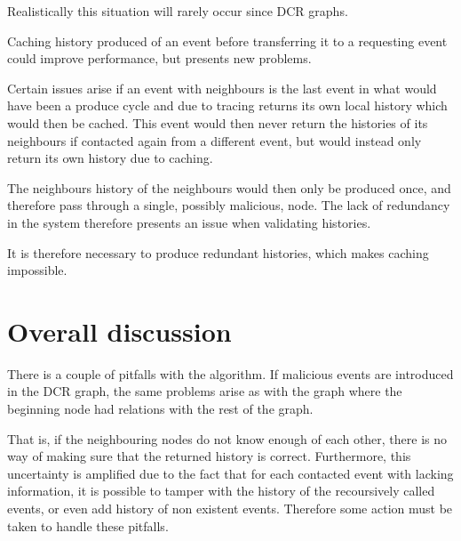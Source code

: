 	Realistically this situation will rarely occur since DCR graphs. 
	
	\newpar Caching history produced of an event before transferring it to a requesting event could improve performance, but presents new problems. 
	
	Certain issues arise if an event with neighbours is the last event in what would have been a produce cycle and due to tracing returns its own local history which would then be cached. This event would then never return the histories of its neighbours if contacted again from a different event, but would instead only return its own history due to caching. 
	
	The neighbours history of the neighbours would then only be produced once, and therefore pass through a single, possibly malicious, node. The lack of redundancy in the system therefore presents an issue when validating histories.  
	
	It is therefore necessary to produce redundant histories, which makes caching impossible.
	
	
	\section{Overall discussion}
	There is a couple of pitfalls with the algorithm. If malicious events are introduced in the DCR graph, the same problems arise as with the graph where the beginning node had relations with the rest of the graph. 
	
	That is, if the neighbouring nodes do not know enough of each other, there is no way of making sure that the returned history is correct. Furthermore, this uncertainty is amplified due to the fact that for each contacted event with lacking information, it is possible to tamper with the history of the recoursively called events, or even add history of non existent events. Therefore some action must be taken to handle these pitfalls. 
	